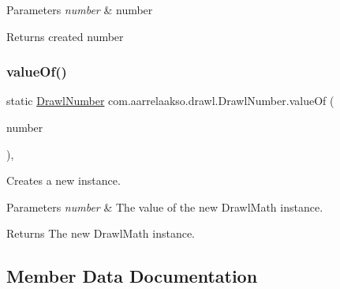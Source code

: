 \begin{DoxyParams}{Parameters}
{\em number} & number \\
\hline
\end{DoxyParams}
\begin{DoxyReturn}{Returns}
created number 
\end{DoxyReturn}
\mbox{\label{classcom_1_1aarrelaakso_1_1drawl_1_1_drawl_number_a6e9ebf8001f798b1e0a58d6c28360298}} 
\subsubsection{\texorpdfstring{value\+Of()}{valueOf()}\hspace{0.1cm}{\footnotesize\ttfamily [4/4]}}
{\footnotesize\ttfamily static \hyperlink{classcom_1_1aarrelaakso_1_1drawl_1_1_drawl_number}{Drawl\+Number} com.\+aarrelaakso.\+drawl.\+Drawl\+Number.\+value\+Of (\begin{DoxyParamCaption}\item[{@Not\+Null Integer}]{number }\end{DoxyParamCaption})\hspace{0.3cm}{\ttfamily [static]}, {\ttfamily [protected]}}



Creates a new instance. 


\begin{DoxyParams}{Parameters}
{\em number} & The value of the new Drawl\+Math instance. \\
\hline
\end{DoxyParams}
\begin{DoxyReturn}{Returns}
The new Drawl\+Math instance. 
\end{DoxyReturn}


\subsection{Member Data Documentation}
\mbox{\label{classcom_1_1aarrelaakso_1_1drawl_1_1_drawl_number_ae0980b8dd35b0bb52b87b37700d15322}} 
